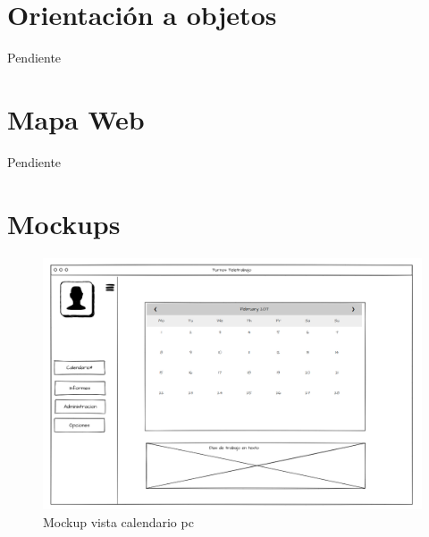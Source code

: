 \documentclass[11pt,spanish,listoffigures,listoftables]{tfgetsinf}
\begin{document}
\section{Orientación a objetos}

Pendiente

\section{Mapa Web}

Pendiente

\section{Mockups}

\begin{figure}[h!] %
   \includegraphics[width=\linewidth]{img/Vista_Calendario_PC.png}
   \caption{Mockup vista calendario pc}
   \label{fig:calendarioPC}
 \end{figure}
\end{document}
